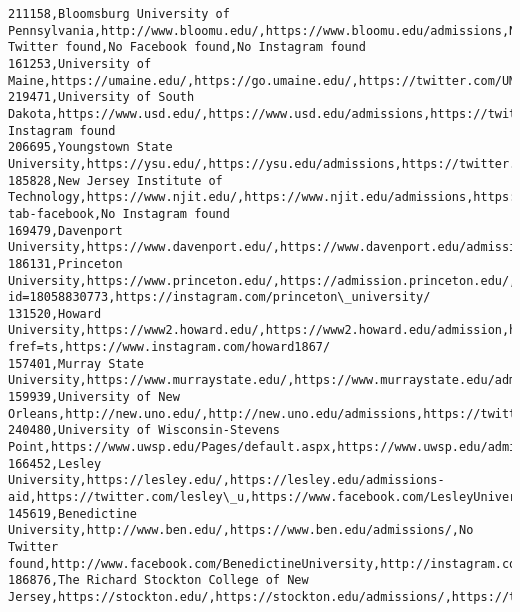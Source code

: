 \documentclass[11pt]{article}
\begin{document}
\begin{Verbatim}[commandchars=\\\{\}]
211158,Bloomsburg University of Pennsylvania,http://www.bloomu.edu/,https://www.bloomu.edu/admissions,No Twitter found,No Facebook found,No Instagram found
161253,University of Maine,https://umaine.edu/,https://go.umaine.edu/,https://twitter.com/UMaine,https://www.facebook.com/UniversityofMaine,https://instagram.com/university.of.maine/
219471,University of South Dakota,https://www.usd.edu/,https://www.usd.edu/admissions,https://twitter.com/usd,https://www.facebook.com/UniversityofSouthDakota,No Instagram found
206695,Youngstown State University,https://ysu.edu/,https://ysu.edu/admissions,https://twitter.com/youngstownstate,https://facebook.com/youngstownstate,https://instagram.com/youngstownstate/
185828,New Jersey Institute of Technology,https://www.njit.edu/,https://www.njit.edu/admissions,https://twitter.com/NJIT,\#eb0cf68e34319-tab-facebook,No Instagram found
169479,Davenport University,https://www.davenport.edu/,https://www.davenport.edu/admissions,http://www.twitter.com/davenportu,http://www.facebook.com/DavenportU,https://instagram.com/davenportuniversity
186131,Princeton University,https://www.princeton.edu/,https://admission.princeton.edu/,https://www.twitter.com/Princeton,https://facebook.com/profile.php?id=18058830773,https://instagram.com/princeton\_university/
131520,Howard University,https://www2.howard.edu/,https://www2.howard.edu/admission,https://twitter.com/HowardU,https://www.facebook.com/HowardU/?fref=ts,https://www.instagram.com/howard1867/
157401,Murray State University,https://www.murraystate.edu/,https://www.murraystate.edu/admissions/,http://twitter.com/murraystateuniv,http://www.facebook.com/murraystateuniv,http://instagram.com/murraystateuniv
159939,University of New Orleans,http://new.uno.edu/,http://new.uno.edu/admissions,https://twitter.com/UofNO,https://www.facebook.com/UniversityOfNewOrleans,https://www.instagram.com/uofno/
240480,University of Wisconsin-Stevens Point,https://www.uwsp.edu/Pages/default.aspx,https://www.uwsp.edu/admissions/Pages/default.aspx,https://twitter.com/UWStevensPoint,https://www.facebook.com/UWStevensPoint,http://instagram.com/uw\_stevens\_point
166452,Lesley University,https://lesley.edu/,https://lesley.edu/admissions-aid,https://twitter.com/lesley\_u,https://www.facebook.com/LesleyUniversity/,https://www.instagram.com/lesleyuniversity/
145619,Benedictine University,http://www.ben.edu/,https://www.ben.edu/admissions/,No Twitter found,http://www.facebook.com/BenedictineUniversity,http://instagram.com/benu1887
186876,The Richard Stockton College of New Jersey,https://stockton.edu/,https://stockton.edu/admissions/,https://twitter.com/Stockton\_edu,https://www.facebook.com/StocktonUniversity,https://www.instagram.com/stocktonuniversity

\end{Verbatim}
\end{document}
